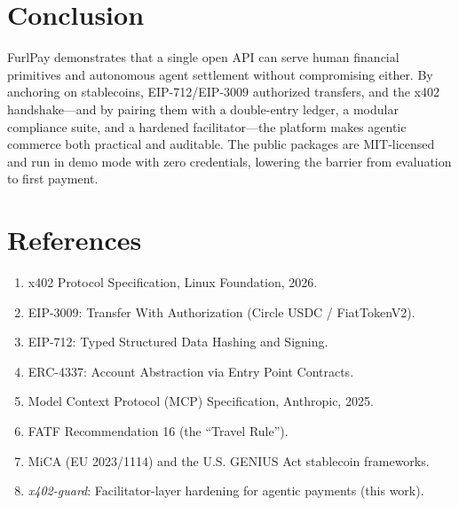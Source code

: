 \documentclass[10pt,twocolumn]{article}
\begin{document}
\section{Conclusion}
FurlPay demonstrates that a single open API can serve human financial primitives
and autonomous agent settlement without compromising either. By anchoring on
stablecoins, EIP-712/EIP-3009 authorized transfers, and the x402 handshake---and by
pairing them with a double-entry ledger, a modular compliance suite, and a hardened
facilitator---the platform makes agentic commerce both practical and auditable. The
public packages are MIT-licensed and run in demo mode with zero credentials,
lowering the barrier from evaluation to first payment.

\section*{References}
\small
\begin{enumerate}[leftmargin=1.4em,itemsep=0pt]
  \item x402 Protocol Specification, Linux Foundation, 2026.
  \item EIP-3009: Transfer With Authorization (Circle USDC / FiatTokenV2).
  \item EIP-712: Typed Structured Data Hashing and Signing.
  \item ERC-4337: Account Abstraction via Entry Point Contracts.
  \item Model Context Protocol (MCP) Specification, Anthropic, 2025.
  \item FATF Recommendation 16 (the ``Travel Rule'').
  \item MiCA (EU 2023/1114) and the U.S. GENIUS Act stablecoin frameworks.
  \item \emph{x402-guard}: Facilitator-layer hardening for agentic payments (this work).
\end{enumerate}
\end{document}
